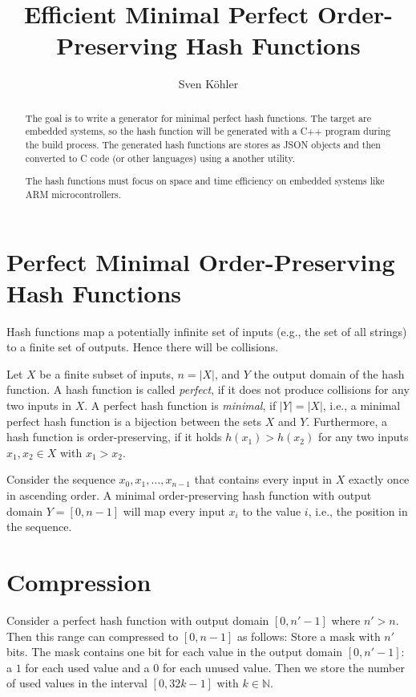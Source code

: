 \documentclass{article}
\title{Efficient Minimal Perfect Order-Preserving Hash Functions}
\author{Sven Köhler}
\newcommand{\Nats}{\mathbb{N}}
\begin{document}
\maketitle

\begin{abstract}
The goal is to write a generator for minimal perfect hash functions.
The target are embedded systems, so the hash function will be generated
with a C++ program during the build process. The generated hash functions
are stores as JSON objects and then converted to C code (or other languages)
using a another utility.

The hash functions must focus on space and time efficiency on embedded systems 
like ARM microcontrollers.
\end{abstract}

\section{Perfect Minimal Order-Preserving Hash Functions}

Hash functions map a potentially infinite set of inputs
(e.g., the set of all strings) 
to a finite set of outputs.
Hence there will be collisions.

Let $X$ be a finite subset of inputs, $n=|X|$, and $Y$ the output domain
of the hash function.
A hash function is called \emph{perfect}, if it does not
produce collisions for any two inputs in $X$. 
A perfect hash function is \emph{minimal}, if $|Y|=|X|$,
i.e., a minimal perfect hash function is a bijection
between the sets $X$ and $Y$. 
Furthermore, a hash function is order-preserving,
if it holds $h(x_1) > h(x_2)$ for any two inputs
$x_1, x_2\in X$ with $x_1 > x_2$.

Consider the sequence $x_0, x_1, \ldots, x_{n-1}$ that
contains every input in $X$ exactly once in ascending
order. A minimal order-preserving hash function with
output domain $Y=[0,n-1]$ will map every input $x_i$
to the value $i$, i.e., the position in the sequence.

\section{Compression}

Consider a perfect hash function with output domain $[0,n'-1]$ where $n'>n$. 
Then this range can compressed to $[0,n-1]$ as follows:
Store a mask with $n'$ bits. The mask contains one bit for each value in the 
output domain $[0,n'-1]$: a $1$ for each used value and a $0$ for each unused 
value. Then we store the number of used values in the interval $[0,32k-1]$ with
$k\in\Nats$.
\end{document}
